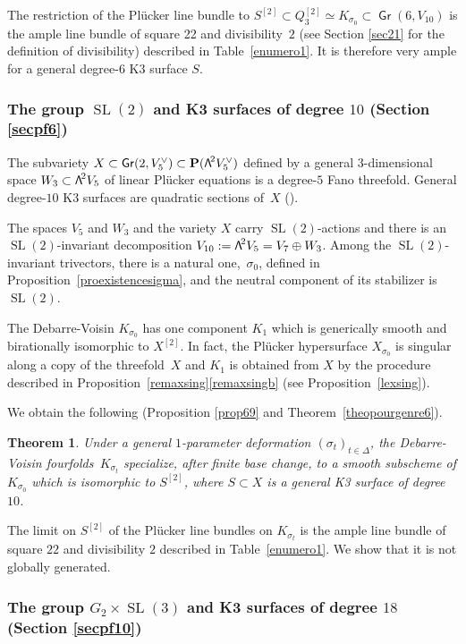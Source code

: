 \documentclass[11pt]{article}
\newcommand{\Subsubsection}{\subsubsection}
\newtheorem{theo}[lemm]{Theorem}
\theoremstyle{definition}
\renewcommand\P{{\mathbf P}}\let\PP\P
\DeclareMathOperator{\Gr}{\mathsf{Gr}}
\let\isom\simeq
\DeclareMathOperator{\SL}{SL}
\newcommand\bw[1]{{\hbox{\large$\mathsf{\Lambda}$}^{\!#1}}}
\newcommand\hilb{{Q_3^{[2]}}}
\newcommand\hilbS{S^{[2]}}
\begin{document}
The restriction of the Plücker line bundle to $\hilbS\subset \hilb\isom K_{\sigma_0}\subset \Gr (6, V_{10} ) $ is the
ample line bundle of square 22 and divisibility~$2$ (see Section
\ref{sec21} for the definition of divisibility) described in Table~\ref{enumero1}.
It is therefore very ample for a general degree-$6$ K3 surface $S$.

\subsubsection{The group $\SL(2)$ and K3 surfaces of degree $10$ (Section \ref{secpf6})}

The subvariety $X\subset \Gr(2,V_5^\vee)\subset \P(\bw2V_5^\vee)$ defined by a general $3$-dimensional
space $W_3\subset \bw2V_5$ of linear Plücker equations is a degree-$5$ Fano threefold. General degree-$10$ K3 surfaces are quadratic sections of~$X$
(\cite{mukai}).

The spaces $V_5$ and $W_3$ and the variety $X$ carry $\SL(2)$-actions and there is an $\SL(2)$-invariant decomposition $V_{10}:=\bw2V_5= V_7 \oplus W_3$.
Among the $\SL(2)$-invariant trivectors, there
is a natural one,~$\sigma_0$, defined in Proposition~\ref{proexistencesigma}, and the neutral component of its stabilizer is $\SL(2) $.

The Debarre-Voisin $K_{\sigma_0}$ has one component $K_1$ which is generically smooth and birationally isomorphic to $X^{[2]}$. In fact, the Plücker hypersurface $X_{\sigma_0}$ is singular along a copy of the threefold~$X$ and $K_1$ is obtained from $X$ by the procedure described in Proposition~\ref{remaxsing}\eqref{remaxsingb} (see Proposition~\ref{lexsing}).

We obtain the following (Proposition \ref{prop69} and Theorem~\ref{theopourgenre6}).

\begin{theo} \label{theohasgenus6}
Under a general $1$-parameter deformation
$(\sigma_t)_{t\in \Delta}$, the Debarre-Voisin fourfolds~$K_{\sigma_t}$ specialize, after finite base change, to a smooth subscheme of $K_{\sigma_0}$ which is isomorphic
to $\hilbS$,
where $S\subset X$ is a general K3 surface of degree $10$.
\end{theo}

The limit on $\hilbS$ of the Plücker line bundles on $K_{\sigma_t}$ is the
ample line bundle of square $22$ and divisibility $2$
described in Table~\ref{enumero1}.
We show that it is not globally generated.

\Subsubsection{The group $G_2\times \SL(3)$ and K3 surfaces of degree $18$ (Section \ref{secpf10})}\label{se114}
\end{document}
